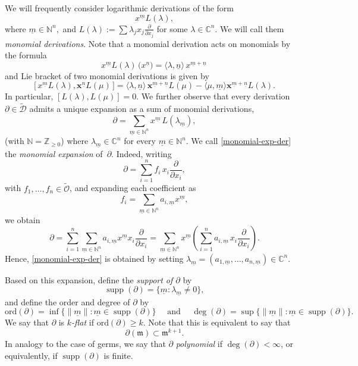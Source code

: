 \documentclass[10pt,twoside,reqno]{amsart}
\theoremstyle{remark}
\theoremstyle{remark}
\newcommand{\N}{\mathbb{N}}
\newcommand{\C}{\mathbb{C}}
\newcommand{\um}{{\underline m}}
\newcommand{\un}{{\underline n}}
\newcommand{\supp}{\operatorname{supp}}
\newcommand{\x}{\mathbf{x}}
\newcommand{\ord}{\mathrm{ord}}
\newcommand{\tO}{\widetilde{\mathcal{O}}}
\newcommand{\cD}{\mathcal{D}}
\newcommand{\tcD}{\widetilde{\cD}}
\begin{document}
We will frequently consider logarithmic derivations of the form
$$
x^{\um} L(\lambda),$$
where $\um \in \N^n,$ and $L (\lambda) := \sum \lambda_j x_j\frac{\partial}{\partial x_j}$ for some $\lambda \in \C^n$.
We will call them {\em monomial derivations}.  Note that a monomial derivation acts on monomials by the formula
\begin{equation}\label{Lie-deriv-monomial}
x^\um L(\lambda)\, \big(x^\un\big) = \langle \lambda , \un  \rangle\,  x^{\um+\un}\, 
\end{equation} 
and Lie bracket of two monomial derivations is given by 
\begin{equation}\label{Lie-bracket-formula} 
\big[ \, x^{\um} L(\lambda), \x^{\un} L(\mu)\, \big]  = \langle \lambda , \un  \rangle \,\x^{\um+\un} L(\mu)  - \langle \mu , \um  \rangle \x^{\um+\un}L(\lambda).
\end{equation}
In particular, $[L(\lambda), L(\mu)] = 0$. We further observe that every derivation $\partial\in\tcD$ admits a unique expansion as a sum of monomial derivations,
\begin{equation}\label{monomial-exp-der}
\partial=\sum_{\um\in\mathbb N^n}x^{\um}\,L(\lambda_{\um}),
\end{equation}
(with $\mathbb N=\mathbb Z_{\ge 0}$) where $\lambda_{\um}\in\mathbb C^n$ for every $\um\in\mathbb N^n$. We call \eqref{monomial-exp-der} the {\em monomial expansion} of~$\partial$.
Indeed, writing
\[
\partial=\sum_{i=1}^n f_i\,x_i\frac{\partial}{\partial x_i},
\]
with $f_1,\ldots,f_n\in\tO$, and expanding each coefficient as
\[
f_i=\sum_{\um\in\mathbb N^n}a_{i,\um}x^{\um},
\]
we obtain
\[
\partial=\sum_{i=1}^n\sum_{\um\in\mathbb N^n}
a_{i,\um}x^{\um}x_i\frac{\partial}{\partial x_i}
=\sum_{\um\in\mathbb N^n}
x^{\um}
\left(
\sum_{i=1}^n
a_{i,\um}\,
x_i\frac{\partial}{\partial x_i}
\right).
\]
Hence, \eqref{monomial-exp-der} is obtained by setting $\lambda_{\um}=(a_{1,\um},\ldots,a_{n,\um})\in\mathbb{C}^n$.

Based on this expansion, define the {\em support of $\partial$} by 
$$\supp(\partial) = \{ {\um}:\lambda_{\um} \ne 0\},$$ 
and define the order and degree of $\partial$ by
\begin{equation}\label{def-degree-order-deriv}
\ord(\partial) = \inf\{\|\um\|: \um \in \supp(\partial)\}\quad \text{ and }\quad \deg(\partial) = \sup\{\|\um\|: \um \in \supp(\partial)\}.
\end{equation}
We say that $\partial$ is {\em $k$-flat} if $\ord(\partial) \geq k$. Note that this is equivalent to say that 
$$
\partial(\mathfrak{m})\subset \mathfrak{m}^{k+1}.
$$
In analogy to the case of germs, we say that $\partial$ {\em polynomial} if $\deg(\partial)<\infty$, or equivalently, if $\supp(\partial)$ is finite. 
\end{document}
